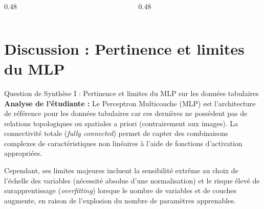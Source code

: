 \begin{columns}
\begin{column}{0.48\textwidth}
\end{column}
\begin{column}{0.48\textwidth}
\end{column}
\end{columns}

\section{Discussion : Pertinence et limites du MLP}

\begin{block}{Question de Synthèse I : Pertinence et limites du MLP sur les données tabulaires}
\textbf{Analyse de l'étudiante :} Le Perceptron Multicouche (MLP) est l'architecture de référence pour les données tabulaires car ces dernières ne possèdent pas de relations topologiques ou spatiales a priori (contrairement aux images). La connectivité totale (\emph{fully connected}) permet de capter des combinaisons complexes de caractéristiques non linéaires à l'aide de fonctions d'activation appropriées.

Cependant, ses limites majeures incluent la sensibilité extrême au choix de l'échelle des variables (nécessité absolue d'une normalisation) et le risque élevé de surapprentissage (\emph{overfitting}) lorsque le nombre de variables et de couches augmente, en raison de l'explosion du nombre de paramètres apprenables.
\end{block}
